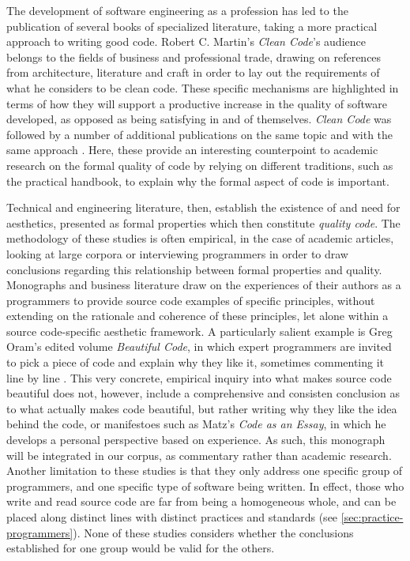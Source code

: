 The development of software engineering as a profession has led to the publication of several books of specialized literature, taking a more practical approach to writing good code. Robert C. Martin's \emph{Clean Code}'s audience belongs to the fields of business and professional trade, drawing on references from architecture, literature and craft in order to lay out the requirements of what he considers to be clean code. These specific mechanisms are highlighted in terms of how they will support a productive increase in the quality of software developed, as opposed as being satisfying in and of themselves. \emph{Clean Code} was followed by a number of additional publications on the same topic and with the same approach \citep{fowler_refactoring_1999,arns_code_2005,hunt_pragmatic_1999}. Here, these provide an interesting counterpoint to academic research on the formal quality of code by relying on different traditions, such as the practical handbook, to explain why the formal aspect of code is important.

Technical and engineering literature, then, establish the existence of and need for aesthetics, presented as formal properties which then constitute \emph{quality code}. The methodology of these studies is often empirical, in the case of academic articles, looking at large corpora or interviewing programmers in order to draw conclusions regarding this relationship between formal properties and quality. Monographs and business literature draw on the experiences of their authors as a programmers to provide source code examples of specific principles, without extending on the rationale and coherence of these principles, let alone within a source code-specific aesthetic framework. A particularly salient example is Greg Oram's edited volume \emph{Beautiful Code}, in which expert programmers are invited to pick a piece of code and explain why they like it, sometimes commenting it line by line \citep{oram_beautiful_2007}. This very concrete, empirical inquiry into what makes source code beautiful does not, however, include a comprehensive and consisten conclusion as to what actually makes code beautiful, but rather writing why they like the idea behind the code, or manifestoes such as Matz's \emph{Code as an Essay}, in which he develops a personal perspective based on experience. As such, this monograph will be integrated in our corpus, as commentary rather than academic research. Another limitation to these studies is that they only address one specific group of programmers, and one specific type of software being written. In effect, those who write and read source code are far from being a homogeneous whole, and can be placed along distinct lines with distinct practices and standards \citep{hayes_cultures_2017} (see \ref{sec:practice-programmers}). None of these studies considers whether the conclusions established for one group would be valid for the others.

